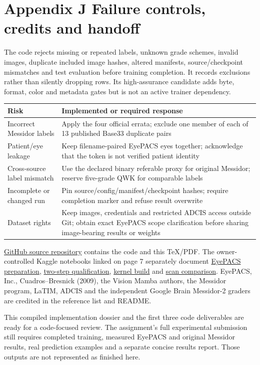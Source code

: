 \newpage
\section*{\color{ink}Appendix J \quad Failure controls, credits and handoff}
The code rejects missing or repeated labels, unknown grade schemes,
invalid images, duplicate included image hashes, altered manifests,
source/checkpoint mismatches and test evaluation before training
completion. It records exclusions rather than silently dropping rows.
Its high-assurance candidate adds byte, format, color and metadata gates
but is not an active trainer dependency.

\small
\begin{tabularx}{\linewidth}{@{}p{.31\linewidth}Y@{}}
\toprule
Risk & Implemented or required response\\
\midrule
Incorrect Messidor labels & Apply the four official errata; exclude one
member of each of 13 published Base33 duplicate pairs\\
Patient/eye leakage & Keep filename-paired EyePACS eyes together;
acknowledge that the token is not verified patient identity\\
Cross-source label mismatch & Use the declared binary referable proxy for
original Messidor; reserve five-grade QWK for comparable labels\\
Incomplete or changed run & Pin source/config/manifest/checkpoint hashes;
require completion marker and refuse result overwrite\\
Dataset rights & Keep images, credentials and restricted ADCIS access
outside Git; obtain exact EyePACS scope clarification before sharing
image-bearing results or weights\\
\bottomrule
\end{tabularx}
\normalsize

\href{https://github.com/dharan1007/internship-task-1}{GitHub source repository}
contains the code and this TeX/PDF. The owner-controlled Kaggle notebooks
linked on page 7 separately document
\href{https://www.kaggle.com/code/dharantejreddy/drvim-prepare-original-eyepacs}{EyePACS preparation},
\href{https://www.kaggle.com/code/dharantejreddy/drvim-full-model-qualification}{two-step qualification},
\href{https://www.kaggle.com/code/dharantejreddy/drvim-pinned-cuda-scan-build}{kernel build} and
\href{https://www.kaggle.com/code/dharantejreddy/drvim-real-eyepacs-cuda-scan-comparison}{scan comparison}.
EyePACS, Inc., Cuadros--Bresnick (2009), the Vision Mamba authors,
the Messidor program, LaTIM, ADCIS and the independent Google Brain
Messidor-2 graders are credited in the reference list and README.

This compiled implementation dossier and the first three code
deliverables are ready for a code-focused review. The assignment's full
experimental submission still requires completed training, measured
EyePACS and original Messidor results, real prediction examples and a
separate concise results report. Those outputs are not represented as
finished here.
